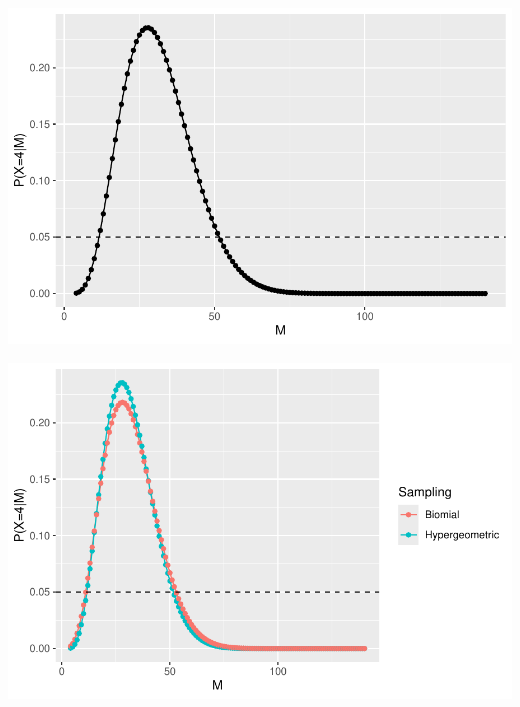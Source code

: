 \begin{frame}

\begin{center}
\includegraphics[height = .8\textheight]{figure/plot1-2}
\end{center}

\end{frame}

\begin{frame}

\begin{center}
\includegraphics[height = .8\textheight]{figure/plot1-3}
\end{center}

\end{frame}

